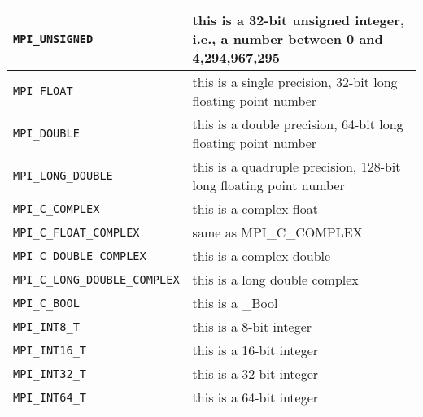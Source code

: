 \begin{longtable}{|>{\centering\arraybackslash} m{5.5cm} | >{\centering\arraybackslash} m{6cm} |}
        \small \texttt{MPI\_UNSIGNED}                 & \small this is a 32-bit unsigned integer, i.e., a number between 0 and 4,294,967,295          \\ \hline
        \small \texttt{MPI\_FLOAT}                    & \small this is a single precision, 32-bit long floating point number                          \\ \hline
        \small \texttt{MPI\_DOUBLE}                   & \small this is a double precision, 64-bit long floating point number                          \\ \hline
        \small \texttt{MPI\_LONG\_DOUBLE}             & \small this is a quadruple precision, 128-bit long floating point number                      \\ \hline
        \small \texttt{MPI\_C\_COMPLEX}               & \small this is a complex float                                                                \\ \hline
        \small \texttt{MPI\_C\_FLOAT\_COMPLEX}        & \small same as MPI\_C\_COMPLEX                                                                \\ \hline
        \small \texttt{MPI\_C\_DOUBLE\_COMPLEX}       & \small this is a complex double                                                               \\ \hline
        \small \texttt{MPI\_C\_LONG\_DOUBLE\_COMPLEX} & \small this is a long double complex                                                          \\ \hline
        \small \texttt{MPI\_C\_BOOL}                  & \small this is a \_Bool                                                                       \\ \hline
        \small \texttt{MPI\_INT8\_T}                  & \small this is a 8-bit integer                                                                \\ \hline
        \small \texttt{MPI\_INT16\_T}                 & \small this is a 16-bit integer                                                               \\ \hline
        \small \texttt{MPI\_INT32\_T}                 & \small this is a 32-bit integer                                                               \\ \hline
        \small \texttt{MPI\_INT64\_T}                 & \small this is a 64-bit integer                                                               \\ \hline

\end{longtable}
